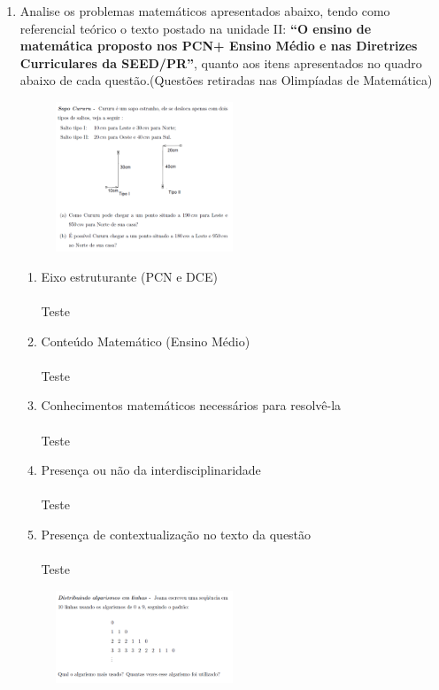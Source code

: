 \documentclass[a4paper, 12pt]{article}
\begin{document}
\begin{enumerate}
\item Analise os problemas matemáticos apresentados abaixo, tendo como referencial teórico o texto postado na unidade II: \textbf{“O ensino de matemática proposto nos PCN+ Ensino Médio e nas Diretrizes Curriculares da SEED/PR”}, quanto aos itens apresentados no quadro abaixo de cada questão.(Questões retiradas nas Olimpíadas de Matemática)
\begin{figure}[h!]
  \centering
  \includegraphics[width=0.5\textwidth]{1}
\end{figure} 
  \begin{enumerate}
  \item Eixo estruturante (PCN e DCE)\\\\
    Teste
  \item Conteúdo Matemático (Ensino Médio) \\\\
    Teste
  \item Conhecimentos matemáticos necessários para resolvê-la \\\\
    Teste
  \item Presença ou não da interdisciplinaridade \\\\
    Teste
  \item Presença de contextualização no texto da questão\\\\
    Teste
  \end{enumerate}
\newpage
\begin{figure}[h!]
  \centering
  \includegraphics[width=0.5\textwidth]{2}

\end{figure}
\end{enumerate}
\end{document}
